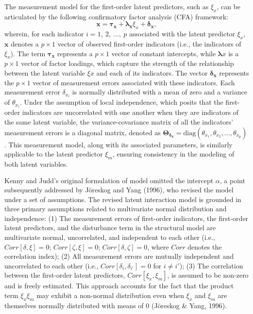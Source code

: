 \documentclass[
  man]{apa6}
\begin{document}
The measurement model for the first-order latent predictors, such as \(\xi_{x}\), can be articulated by the following confirmatory factor analysis (CFA) framework:
\begin{equation}
\mathbf{x} = \boldsymbol{\tau_{x}} + \boldsymbol{\lambda_{x}}\xi_{x} + \boldsymbol{\delta_{x}},
\end{equation}
wherein, for each indicator \(i = 1, \ 2, \ ..., \ p\) associated with the latent predictor \(\xi_{x}\), \(\mathbf{x}\) denotes a \(p \times 1\) vector of observed first-order indicators (i.e., the indicators of \(\xi_{x}\)). The term \(\boldsymbol{\tau_{x}}\) represents a \(p \times 1\) vector of constant intercepts, while \(\boldsymbol{\lambda}{x}\) is a \(p \times 1\) vector of factor loadings, which capture the strength of the relationship between the latent variable \(\xi{x}\) and each of its indicators. The vector \(\boldsymbol{\delta_{x}}\) represents the \(p \times 1\) vector of measurement errors associated with these indicators. Each measurement error \(\delta_{x_{i}}\) is normally distributed with a mean of zero and a variance of \(\theta_{x_{i}}\). Under the assumption of local independence, which posits that the first-order indicators are uncorrelated with one another when they are indicators of the same latent variable, the variance-covariance matrix of all the indicators' measurement errors is a diagonal matrix, denoted as \(\mathbf{\Theta_{\delta_{x}}} = \text{diag}(\theta_{x_{1}}, \theta_{x_{2}}, ..., \theta_{x_{p}})\). This measurement model, along with its associated parameters, is similarly applicable to the latent predictor \(\xi_{m}\), ensuring consistency in the modeling of both latent variables.

Kenny and Judd's original formulation of model omitted the intercept \(\alpha\), a point subsequently addressed by Jöreskog and Yang (1996), who revised the model under a set of assumptions. The revised latent interaction model is grounded in three primary assumptions related to multivariate normal distribution and independence: (1) The measurement errors of first-order indicators, the first-order latent predictors, and the disturbance term in the structural model are multivariate normal, uncorrelated, and independent to each other (i.e., \(Corr[\delta, \xi] = 0\); \(Corr[\zeta, \xi] = 0\); \(Corr[\delta, \zeta] = 0\), where \(Corr\) denotes the correlation index); (2) All measurement errors are mutually independent and uncorrelated to each other (i.e., \(Corr[\delta_{i}, \delta_{i'}] = 0\) for \(i \neq i'\)); (3) The correlation between the first-order latent predictors, \(Corr[\xi_{x}, \xi_{m}]\), is assumed to be non-zero and is freely estimated. This approach accounts for the fact that the product term \(\xi_{x}\xi_{m}\) may exhibit a non-normal distribution even when \(\xi_{x}\) and \(\xi_{m}\) are themselves normally distributed with means of 0 (Jöreskog \& Yang, 1996).
\end{document}
